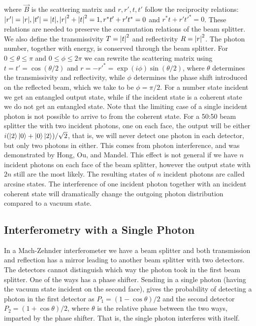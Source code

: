 where $\vec{B}$ is the scattering matrix and $r,r',t,t'$ follow the reciprocity relations: $\abs{r'} = \abs{r}, \abs{t'}=\abs{t}, \abs{r}^2 + \abs{t}^2 = 1, r^*t' + r't^* = 0$ and $r^*t + r't'^*=0$. These relations are needed to preserve the commutation relations of the beam splitter. We also define the transmissivity $T=\abs{t}^2$ and reflectivity $R=\abs{r}^2$. The photon number, together with energy, is conserved through the beam splitter. For $0\leq \theta \leq \pi$ and $0\leq \phi \leq 2\pi$ we can rewrite the scattering matrix using $t=t'=\cos(\theta/2)$ and $r=-r'^* = \exp(i\phi)\sin(\theta/2)$, where $\theta$ determines the transmissivity and reflectivity, while $\phi$ determines the phase shift introduced on the reflected beam, which we take to be $\phi = \pi/2$.  For a number state incident we get an entangled output state, while if the incident state is a coherent state we do not get an entangled state. Note that the limiting case of a single incident photon is not possible to arrive to from the coherent state. For a 50:50 beam splitter the with two incident photons, one on each face, the output will be either $i(\ket{2}\ket{0} + \ket{0}\ket{2})/\sqrt{2}$, that is, we will never detect one photon in each detector, but only two photons in either. This comes from photon interference, and was demonstrated by Hong, Ou, and Mandel. This effect is not general if we have $n$ incident photons on each face of the beam splitter, however the output state with $2n$ still are the most likely. The resulting states of $n$ incident photons are called arcsine states. The interference of one incident photon together with an incident coherent state will dramatically change the outgoing photon distribution compared to a vacuum state. 

\subsection{Interferometry with a Single Photon}
In a Mach-Zehnder interferometer we have a beam splitter and both transmission and reflection has a mirror leading to another beam splitter with two detectors. The detectors cannot distinguish which way the photon took in the first beam splitter. One of the ways has a phase shifter. Sending in a single photon (having the vacuum state incident on the second face), gives the probability of detecting a photon in the first detector as $P_1 = (1-\cos\theta)/2$ and the second detector $P_2 = (1+\cos\theta)/2$, where $\theta$ is the relative phase between the two ways, imparted by the phase shifter. That is, the single photon interferes with itself. 

